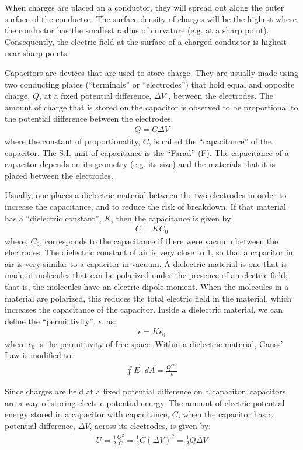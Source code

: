 \begin{chapterSummary}
When charges are placed on a conductor, they will spread out along the outer surface of the conductor. The surface density of charges will be the highest where the conductor has the smallest radius of curvature (e.g. at a sharp point). Consequently, the electric field at the surface of a charged conductor is highest near sharp points.

Capacitors are devices that are used to store charge. They are usually made using two conducting plates (``terminals'' or ``electrodes'') that hold equal and opposite charge, $Q$, at a fixed potential difference, $\Delta V$ , between the electrodes. The amount of charge that is stored on the capacitor is observed to be proportional to the potential difference between the electrodes:
\begin{align*}
Q=C\Delta V
\end{align*}
where the constant of proportionality, $C$, is called the ``capacitance'' of the capacitor. The S.I. unit of capacitance is the ``Farad'' (F). The capacitance of a capacitor depends on its geometry (e.g. its size) and the materials that it is placed between the electrodes.

Usually, one places a dielectric material between the two electrodes in order to increase the capacitance, and to reduce the risk of breakdown. If that material has a ``dielectric constant'', $K$, then the capacitance is given by:
\begin{align*}
C=KC_0
\end{align*}
where, $C_0$, corresponds to the capacitance if there were vacuum between the electrodes. The dielectric constant of air is very close to 1, so that a capacitor in air is very similar to a capacitor in vacuum. A dielectric material is one that is made of molecules that can be polarized under the presence of an electric field; that is, the molecules have an electric dipole moment. When the molecules in a material are polarized, this reduces the total electric field in the material, which increases the capacitance of the capacitor. Inside a dielectric material, we can define the ``permittivity'', $\epsilon$, as:
\begin{align*}
\epsilon=K\epsilon_0
\end{align*}
where $\epsilon_0$ is the permittivity of free space. Within a dielectric material, Gauss' Law is modified to:
\begin{align*}
\oint \vec E \cdot d\vec A=\frac{Q^{enc}}{\epsilon}
\end{align*}

Since charges are held at a fixed potential difference on a capacitor, capacitors are a way of storing electric potential energy. The amount of electric potential energy stored in a capacitor with capacitance, $C$, when the capacitor has a potential difference, $\Delta V$, across its electrodes, is given by:
\begin{align*}
U = \frac{1}{2}\frac{Q^2}{C} = \frac{1}{2}C(\Delta V)^2=\frac{1}{2}Q\Delta V
\end{align*}


\end{chapterSummary}

